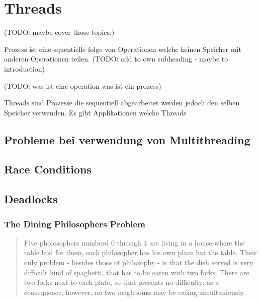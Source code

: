 \section{Threads}
\label{section: Threads}


(TODO: maybe cover those topics:)



Prozess ist eine squentielle folge von Operationen welche keinen Speicher mit anderen Operationen teilen. (TODO: add to own subheading - maybe to introduction)


(TODO: was ist eine operation was ist ein prozess)

Threads sind Prozesse die sequentiell abgearbeitet werden jedoch den selben Speicher verwenden. \cite[p. 2]{Lee06} Es gibt Applikationen welche Threads








\subsection{Probleme bei verwendung von Multithreading}

\subsection{Race Conditions}

\subsection{Deadlocks}

\subsubsection{The Dining Philosophers Problem}

\begin{quote}
	Five pholosophers numberd 0 through 4 are living in a house where the table laid for them, each philosopher has his own place hat the table. Their only problem - besides those of philosophy - is that the dish served is very difficult kind of spaghetti, that has to be eaten with two forks. There are two forks next to each plate, so that presents no difficulty: as a consequence, however, no two neighbours may be eating simultaniously. \cite[p. 21]{dij71}
\end{quote} 


